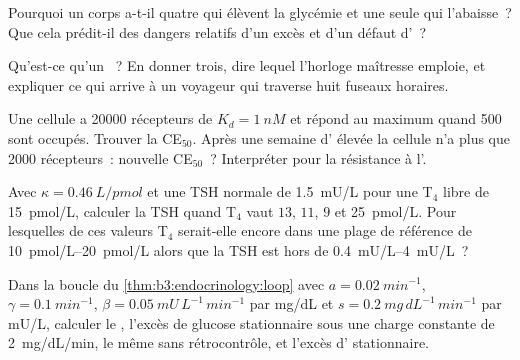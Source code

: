 \begin{exercise}[$\star$]\label{exo:b3:endocrinology:3}
Pourquoi un corps a-t-il quatre  qui élèvent la glycémie et une
seule qui l'abaisse~? Que cela prédit-il des dangers relatifs d'un excès
et d'un défaut d'~?
\end{exercise}

\begin{exercise}[$\star$]\label{exo:b3:endocrinology:4}
Qu'est-ce qu'un ~? En donner trois, dire lequel l'horloge
maîtresse emploie, et expliquer ce qui arrive à un voyageur qui traverse
huit fuseaux horaires.
\end{exercise}

\begin{exercise}[$\star\star$]\label{exo:b3:endocrinology:5}
Une cellule a \num{20000} récepteurs de $K_{d} = \qty{1}{nM}$ et répond
au maximum quand \num{500} sont occupés. Trouver la CE$_{50}$. Après une
semaine d' élevée la cellule n'a plus que \num{2000} récepteurs~:
nouvelle CE$_{50}$~? Interpréter pour la résistance à l'.
\end{exercise}

\begin{exercise}[$\star\star$]\label{exo:b3:endocrinology:6}
Avec $\kappa = \qty{0.46}{L/pmol}$ et une TSH normale de \qty{1.5}{mU/L}
pour une T$_{4}$ libre de \qty{15}{pmol/L}, calculer la TSH quand
T$_{4}$ vaut $13$, $11$, $9$ et \qty{25}{pmol/L}. Pour lesquelles de ces
valeurs T$_{4}$ serait-elle encore dans une plage de référence de
\qtyrange{10}{20}{pmol/L} alors que la TSH est hors de
\qtyrange{0.4}{4}{mU/L}~?
\end{exercise}

\begin{exercise}[$\star\star$]\label{exo:b3:endocrinology:7}
Dans la boucle du \cref{thm:b3:endocrinology:loop} avec $a = \qty{0.02}{min^{-1}}$,
$\gamma = \qty{0.1}{min^{-1}}$, $\beta = \qty{0.05}{mU\,L^{-1}\,min^{-1}}$
par mg/dL et $s = \qty{0.2}{mg\,dL^{-1}\,min^{-1}}$ par mU/L, calculer
le , l'excès de glucose stationnaire sous une charge
constante de \qty{2}{mg/dL/min}, le même sans rétrocontrôle, et l'excès
d' stationnaire.
\end{exercise}


